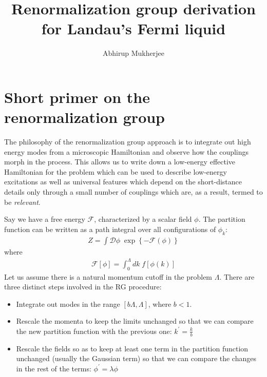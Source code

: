 \documentclass[14pt]{extarticle}
\title{Renormalization group derivation for Landau's Fermi liquid}
\author{Abhirup Mukherjee}
\begin{document}
\maketitle
\tableofcontents
\clearpage
\section{Short primer on the renormalization group}
The philosophy of the renormalization group approach is to integrate out high energy modes from a microscopic Hamiltonian and observe how the couplings morph in the process. This allows us to write down a low-energy effective Hamiltonian for the problem which can be used to describe low-energy excitations as well as universal features which depend on the short-distance details only through a small number of couplings which are, as a result, termed to be \textit{relevant}.

Say we have a free energy \(\mathcal{F}\), characterized by a scalar field \(\phi\). The partition function can be written as a path integral over all configurations of \(\phi_k\):
\begin{equation}\begin{aligned}
\label{oldpart}
Z = \int \mathcal{D}\phi \;\exp\left\{-\mathcal{F}(\phi)\right\}
\end{aligned}\end{equation}
where 
\begin{equation}\begin{aligned}
\mathcal{F}[\phi] = \int_0^\Lambda dk \;f[\phi(k)]
\end{aligned}\end{equation}
Let us assume there is a natural momentum cutoff in the problem \(\Lambda\). There are three distinct steps involved in the RG procedure:
\begin{itemize}
	\item Integrate out modes in the range \(\left[b\Lambda,\Lambda\right]\), where \(b < 1\).
	\item Rescale the momenta to keep the limits unchanged so that we can compare the new partition function with the previous one: \(k^\prime = \frac{k}{b}\)
	\item Rescale the fields so as to keep at least one term in the partition function unchanged (usually the Gaussian term) so that we can compare the changes in the rest of the terms: \(\phi^\prime = \lambda\phi\)
\end{itemize}
\end{document}
